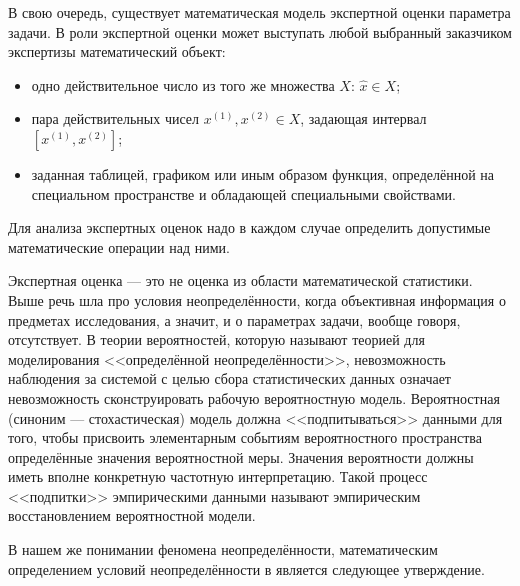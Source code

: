 В свою очередь, существует математическая модель экспертной оценки параметра задачи. %
В роли экспертной оценки может выступать любой выбранный заказчиком экспертизы математический объект: 
\begin{itemize}
  \item одно действительное число из того же множества $X$: $\hat{x} \in X$;
  \item пара действительных чисел $x^{(1)}, x^{(2)} \in X$, задающая интервал $[x^{(1)}, x^{(2)}]$;
  \item {}заданная таблицей, графиком или иным образом функция, определённой на специальном пространстве и обладающей специальными свойствами.
\end{itemize}
Для анализа экспертных оценок надо в каждом случае определить допустимые математические операции над ними.

Экспертная оценка --- это не оценка из области математической статистики. Выше речь шла про условия неопределённости, когда объективная информация о предметах исследования, а значит, и о параметрах задачи, вообще говоря, отсутствует. В теории вероятностей, которую называют теорией для моделирования <<определённой неопределённости>>, невозможность наблюдения за системой с целью сбора статистических данных означает невозможность сконструировать рабочую вероятностную модель. Вероятностная (синоним --- стохастическая) модель должна <<подпитываться>> данными для того, чтобы присвоить элементарным событиям вероятностного пространства определённые значения вероятностной меры. Значения вероятности должны иметь вполне конкретную частотную интерпретацию. Такой процесс <<подпитки>> эмпирическими данными называют эмпирическим восстановлением вероятностной модели.

В нашем же понимании феномена неопределённости, математическим определением условий неопределённости в  является следующее утверждение. 
\begin{center}  \end{center} 

